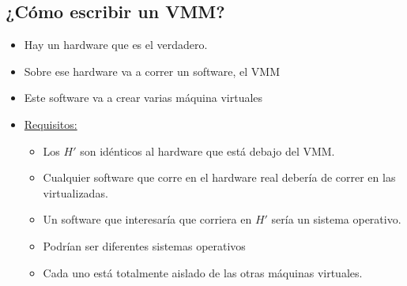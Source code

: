 \documentclass[12pt, times]{simauth}
\begin{document}
\subsection{¿Cómo escribir un VMM?}

\begin{center}
\end{center}

\begin{itemize}

\item Hay un hardware que es el verdadero.
\item Sobre ese hardware va a correr un software, el VMM
\item Este software va a crear varias máquina virtuales 
\item \underline{Requisitos:}
    \begin{itemize}
        \item Los $H'$ son idénticos al hardware que está debajo del VMM.
        \item Cualquier software que corre en el hardware real debería de correr en las virtualizadas.
        \item Un software que interesaría que corriera en $H'$ sería un sistema operativo.
        \item Podrían ser diferentes sistemas operativos
        \item Cada uno está totalmente aislado de las otras máquinas virtuales.
    \end{itemize}
\end{itemize}
\end{document}
